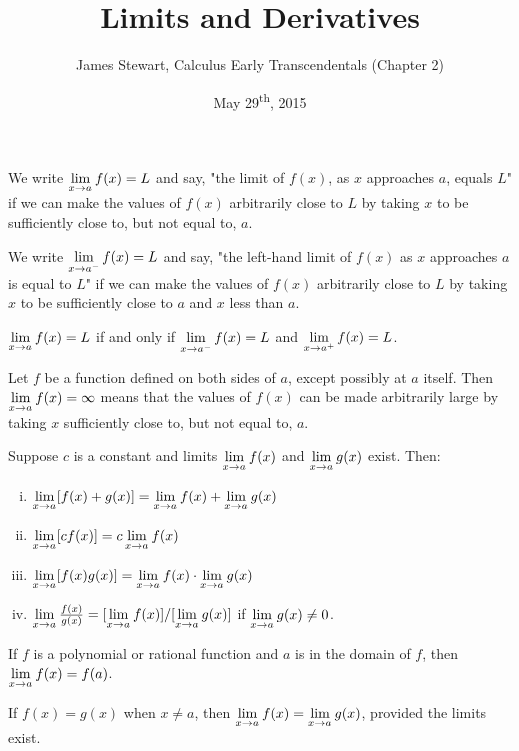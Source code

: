 \documentclass[a4paper,11pt]{article}
\title{Limits and Derivatives}
\author{James Stewart, Calculus Early Transcendentals (Chapter 2)}
\date{May 29\textsuperscript{th}, 2015}
\begin{document}
\maketitle
{}

\begin{outline}

    We write \(\xlimit{x}{a} f(x)=L\) and say, "the limit of \(f(x)\), as \(x\) approaches
    \(a\), equals \(L\)" if we can make the values of \(f(x)\) arbitrarily close to \(L\) by taking \(x\) 
    to be sufficiently close to, but not equal to, \(a\).
    
    We write \(\xlimit[-]{x}{a} f(x)=L\) and say, "the left-hand limit of \(f(x)\) as \(x\)
    approaches \(a\) is equal to \(L\)" if we can make the values of \(f(x)\) arbitrarily close to \(L\) by
    taking \(x\) to be sufficiently close to \(a\) and \(x\) less than \(a\).
    
    \(\xlimit{x}{a} f(x) = L\) if and only if \(\xlimit[-]{x}{a} f(x) = L\)
    and \(\xlimit[+]{x}{a} f(x) = L\).
    
    Let \(f\) be a function defined on both sides of \(a\), except possibly at \(a\) itself. Then
    \(\xlimit{x}{a} f(x) = \infty\) means that the values of \(f(x)\) can be made arbitrarily large 
    by taking \(x\) sufficiently close to, but not equal to, \(a\).
    
    Suppose \(c\) is a constant and limits \(\xlimit{x}{a} f(x)\) and \(\xlimit{x}{a} g(x)\) exist. Then:
    \begin{enumerate}[i.]
      \item 
        \(\xlimit{x}{a} [f(x) + g(x)] = \xlimit{x}{a} f(x) + \xlimit{x}{a} g(x)\)
      \item
        \(\xlimit{x}{a} [cf(x)] = c \xlimit{x}{a} f(x)\)
      \item
        \(\xlimit{x}{a} [f(x)g(x)] = \xlimit{x}{a} f(x) \cdot \xlimit{x}{a} g(x)\)
      \item
        \(\xlimit{x}{a} \frac{f(x)}{g(x)} = [\xlimit{x}{a}f(x)]/[\xlimit{x}{a}g(x)]\) if
        \(\xlimit{x}{a}g(x) \neq 0\).
    \end{enumerate}
    
    If \(f\) is a polynomial or rational function and \(a\) is in the domain of \(f\), then
    \(\xlimit{x}{a} f(x) = f(a)\).
    
    If \(f(x) = g(x)\) when \(x \neq a\), then \(\xlimit{x}{a}f(x) = \xlimit{x}{a}g(x)\), provided the
    limits exist.
    

\end{outline}
\end{document}
